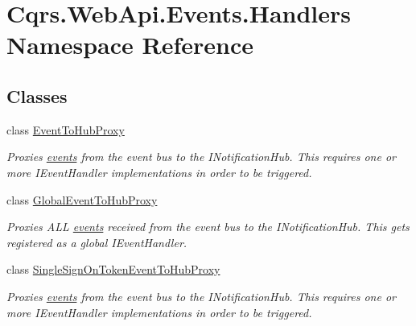\hypertarget{namespaceCqrs_1_1WebApi_1_1Events_1_1Handlers}{}\section{Cqrs.\+Web\+Api.\+Events.\+Handlers Namespace Reference}
\label{namespaceCqrs_1_1WebApi_1_1Events_1_1Handlers}
\subsection*{Classes}
\begin{DoxyCompactItemize}
\item 
class \hyperlink{classCqrs_1_1WebApi_1_1Events_1_1Handlers_1_1EventToHubProxy}{Event\+To\+Hub\+Proxy}
\begin{DoxyCompactList}\small\item\em Proxies \hyperlink{}{events} from the event bus to the I\+Notification\+Hub. This requires one or more I\+Event\+Handler implementations in order to be triggered. \end{DoxyCompactList}\item 
class \hyperlink{classCqrs_1_1WebApi_1_1Events_1_1Handlers_1_1GlobalEventToHubProxy}{Global\+Event\+To\+Hub\+Proxy}
\begin{DoxyCompactList}\small\item\em Proxies A\+LL \hyperlink{}{events} received from the event bus to the I\+Notification\+Hub. This gets registered as a global I\+Event\+Handler. \end{DoxyCompactList}\item 
class \hyperlink{classCqrs_1_1WebApi_1_1Events_1_1Handlers_1_1SingleSignOnTokenEventToHubProxy}{Single\+Sign\+On\+Token\+Event\+To\+Hub\+Proxy}
\begin{DoxyCompactList}\small\item\em Proxies \hyperlink{}{events} from the event bus to the I\+Notification\+Hub. This requires one or more I\+Event\+Handler implementations in order to be triggered. \end{DoxyCompactList}\end{DoxyCompactItemize}
